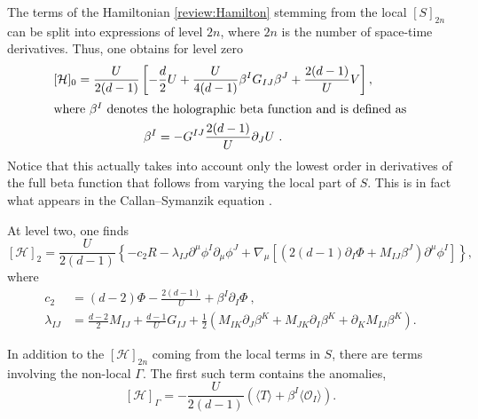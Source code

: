 \documentclass[a4paper,12pt]{article}
\begin{document}
The terms of the Hamiltonian \eqref{review:Hamilton} stemming from the
local $[S]_{2n}$ can be split into
expressions of level $2n$, where $2n$ is the number of space-time
derivatives. Thus, one obtains for level zero
\begin{gather}
\label{review:H0}
  [\mathcal{H}]_0 = \frac{U}{2(d-1)}\left[-\frac{d}2 U +
  \frac{U}{4(d-1)} \beta^I G_{IJ} \beta^J + \frac{2(d-1)}U V \right],
  \\ 
\intertext{where $\beta^I$ denotes the holographic beta function and
  is defined as}
\label{review:beta}
  \beta^I = - G^{IJ} \frac{2(d-1)}U \partial_J U~. 
\end{gather}
Notice that this actually takes into account
only the lowest order in derivatives of the full beta function that
follows from varying the local part of $S$. This is in fact what 
appears in the Callan--Symanzik equation \cite{deBoer00a}. 
    
At level two, one finds
\begin{equation}
\label{review:H2}
  [\mathcal{H}]_2 = \frac{U}{2(d-1)} \left\{ -c_2 R 
  - \lambda_{IJ} \partial^\mu \phi^I \partial_\mu \phi^J + \nabla_\mu
  \left[ \left( 2(d-1) \partial_I \Phi +M_{IJ} \beta^J\right)
  \partial^\mu \phi^I \right] \right\},
\end{equation}
where
\begin{align}
\label{review:c2}
  c_2 &= (d-2) \Phi - \frac{2(d-1)}U +\beta^I \partial_I \Phi~,\\
\label{review:lambda}
  \lambda_{IJ} &= \frac{d-2}2 M_{IJ} +\frac{d-1}U G_{IJ} +\frac12
  \left( M_{IK} \partial_J \beta^K + M_{JK} \partial_I \beta^K +
  \partial_K M_{IJ} \beta^K \right).
\end{align}

In addition to the $[\mathcal{H}]_{2n}$ coming from the local terms in
$S$, there are terms involving the non-local $\Gamma$. The first
such term contains the anomalies,
\begin{equation}
\label{review:Hd}
  [\mathcal{H}]_\Gamma = -\frac{U}{2(d-1)} \left( \langle T\rangle +\beta^I
  \langle \mathcal{O}_I \rangle \right).
\end{equation}
\end{document}
